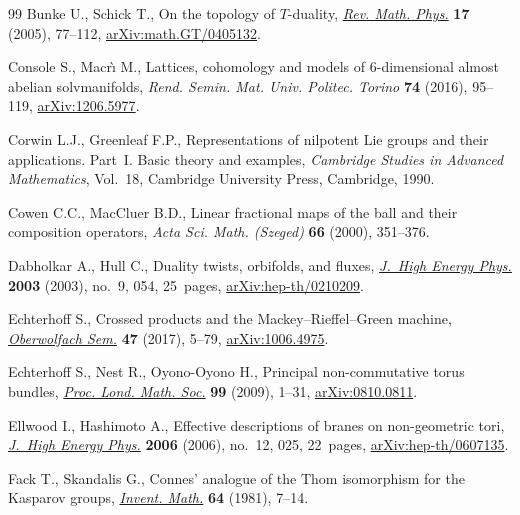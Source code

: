 \documentclass[10pt,a4paper]{amsart}
\numberwithin{equation}{section}
\begin{document}
\begin{thebibliography}{99}
Bunke U., Schick T., On the topology of {$T$}-duality, \href{https://doi.org/10.1142/S0129055X05002315}{\textit{Rev. Math.
 Phys.}} \textbf{17} (2005), 77--112, \href{https://arxiv.org/abs/math.GT/0405132}{arXiv:math.GT/0405132}.

Console S., Macr\`{\i} M., Lattices, cohomology and models of 6-dimensional
 almost abelian solvmanifolds, \textit{Rend. Semin. Mat. Univ. Politec.
 Torino} \textbf{74} (2016), 95--119, \href{https://arxiv.org/abs/1206.5977}{arXiv:1206.5977}.

Corwin L.J., Greenleaf F.P., Representations of nilpotent {L}ie groups and
 their applications. {P}art~{I}. Basic theory and examples, \textit{Cambridge
 Studies in Advanced Mathematics}, Vol.~18, Cambridge University Press,
 Cambridge, 1990.

Cowen C.C., MacCluer B.D., Linear fractional maps of the ball and their
 composition operators, \textit{Acta Sci. Math. (Szeged)} \textbf{66} (2000),
 351--376.

Dabholkar A., Hull C., Duality twists, orbifolds, and fluxes, \href{https://doi.org/10.1088/1126-6708/2003/09/054}{\textit{J.~High
 Energy Phys.}} \textbf{2003} (2003), no.~9, 054, 25~pages,
 \href{https://arxiv.org/abs/hep-th/0210209}{arXiv:hep-th/0210209}.

Echterhoff S., Crossed products and the Mackey--Rieffel--Green machine,
 \href{https://doi.org/10.1088/1126-6708/2003/09/054}{\textit{Oberwolfach Sem.}} \textbf{47} (2017), 5--79, \href{https://arxiv.org/abs/1006.4975}{arXiv:1006.4975}.

Echterhoff S., Nest R., Oyono-Oyono H., Principal non-commutative torus
 bundles, \href{https://doi.org/10.1112/plms/pdn050}{\textit{Proc. Lond. Math. Soc.}} \textbf{99} (2009), 1--31,
 \href{https://arxiv.org/abs/#2}{arXiv:0810.0811}.

Ellwood I., Hashimoto A., Effective descriptions of branes on non-geometric
 tori, \href{https://doi.org/10.1088/1126-6708/2006/12/025}{\textit{J.~High Energy Phys.}} \textbf{2006} (2006), no.~12, 025,
 22~pages, \href{https://arxiv.org/abs/hep-th/0607135}{arXiv:hep-th/0607135}.

Fack T., Skandalis G., Connes' analogue of the {T}hom isomorphism for the
 {K}asparov groups, \href{https://doi.org/10.1007/BF01393931}{\textit{Invent. Math.}} \textbf{64} (1981), 7--14.


\end{thebibliography}
\end{document}
